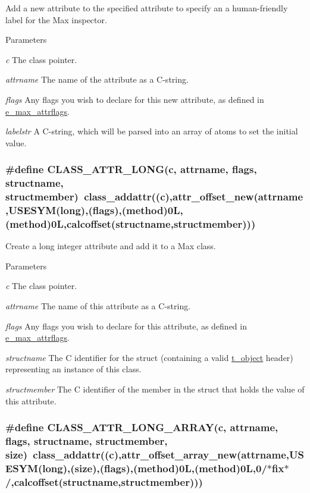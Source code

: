 Add a new attribute to the specified attribute to specify an a human-\/friendly label for the Max inspector. 
\begin{DoxyParams}{Parameters}
\item[{\em c}]The class pointer. \item[{\em attrname}]The name of the attribute as a C-\/string. \item[{\em flags}]Any flags you wish to declare for this new attribute, as defined in \hyperlink{group__attr_gaf296cfc6741bb19207f6ed8062809115}{e\_\-max\_\-attrflags}. \item[{\em labelstr}]A C-\/string, which will be parsed into an array of atoms to set the initial value. \end{DoxyParams}
\hypertarget{group__attr_ga43c26d1f717ae67c1634b4ed4df5645c}{
\subsubsection[{CLASS\_\-ATTR\_\-LONG}]{\setlength{\rightskip}{0pt plus 5cm}\#define CLASS\_\-ATTR\_\-LONG(c, \/  attrname, \/  flags, \/  structname, \/  structmember)~class\_\-addattr((c),attr\_\-offset\_\-new(attrname,USESYM(long),(flags),({\bf method})0L,(method)0L,calcoffset(structname,structmember)))}}
\label{group__attr_ga43c26d1f717ae67c1634b4ed4df5645c}


Create a long integer attribute and add it to a Max class. 
\begin{DoxyParams}{Parameters}
\item[{\em c}]The class pointer. \item[{\em attrname}]The name of this attribute as a C-\/string. \item[{\em flags}]Any flags you wish to declare for this attribute, as defined in \hyperlink{group__attr_gaf296cfc6741bb19207f6ed8062809115}{e\_\-max\_\-attrflags}. \item[{\em structname}]The C identifier for the struct (containing a valid \hyperlink{structt__object}{t\_\-object} header) representing an instance of this class. \item[{\em structmember}]The C identifier of the member in the struct that holds the value of this attribute. \end{DoxyParams}
\hypertarget{group__attr_ga94e513437526908f50ab3262c4518139}{
\subsubsection[{CLASS\_\-ATTR\_\-LONG\_\-ARRAY}]{\setlength{\rightskip}{0pt plus 5cm}\#define CLASS\_\-ATTR\_\-LONG\_\-ARRAY(c, \/  attrname, \/  flags, \/  structname, \/  structmember, \/  size)~class\_\-addattr((c),attr\_\-offset\_\-array\_\-new(attrname,USESYM(long),(size),(flags),({\bf method})0L,(method)0L,0/$\ast$fix$\ast$/,calcoffset(structname,structmember)))}}
\label{group__attr_ga94e513437526908f50ab3262c4518139}


